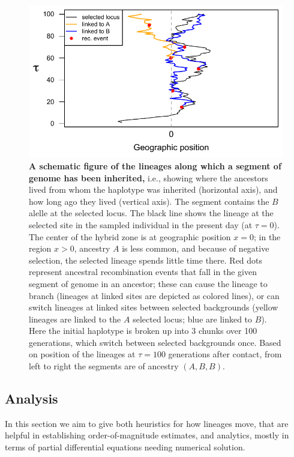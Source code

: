 \documentclass[11pt,letterpaper]{article}
\begin{document}
\begin{figure}
\includegraphics{figs/BM_schematic}
\caption{
    \textbf{A schematic figure of the lineages along which a segment of genome has been inherited,}
    i.e., showing where the ancestors lived from whom the haplotype was inherited (horizontal axis),
    and how long ago they lived (vertical axis).
    The segment contains the $B$ alelle at the selected locus.
    The black line shows the lineage at the selected site in the sampled individual in the present day (at $\tau=0$).
    The center of the hybrid zone is at geographic position $x=0$; in the region $x>0$, ancestry $A$ is less common,
    and because of negative selection, the selected lineage spends little time there.
    Red dots represent ancestral recombination events that fall in the given segment of genome in an ancestor;
    these can cause the lineage to branch (lineages at linked sites are depicted as colored lines),
    or can switch lineages at linked sites between selected backgrounds 
    (yellow lineages are linked to the $A$ selected locus; blue are linked to $B$).
    Here the initial haplotype is broken up into 3 chunks over 100 generations,
    which switch between selected backgrounds once.
    Based on position of the lineages at $\tau=100$ generations after contact, 
    from left to right the segments are of ancestry $(A,B,B)$.
}\label{Fig:schematic}
\end{figure}


\subsection*{Analysis}

In this section we aim to give both heuristics for how lineages move, 
that are helpful in establishing order-of-magnitude estimates,
and analytics, mostly in terms of partial differential equations needing numerical solution.
\end{document}
